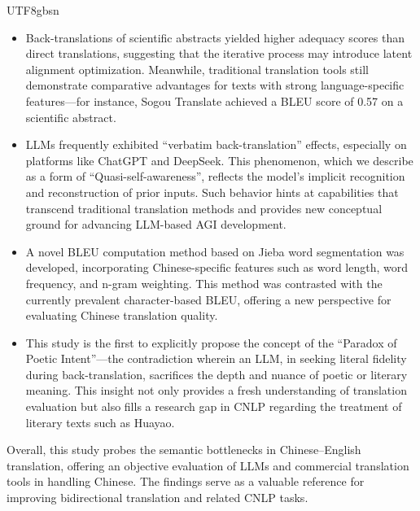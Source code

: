 \documentclass[conference]{IEEEtran}
\begin{document}
\begin{CJK*}{UTF8}{gbsn}
\begin{itemize}
\item Back-translations of scientific abstracts yielded higher adequacy scores than direct translations, suggesting that the iterative process may introduce latent alignment optimization. Meanwhile, traditional translation tools still demonstrate comparative advantages for texts with strong language-specific features—for instance, Sogou Translate achieved a BLEU score of 0.57 on a scientific abstract.

\item LLMs frequently exhibited “verbatim back-translation” effects, especially on platforms like ChatGPT and DeepSeek. This phenomenon, which we describe as a form of “Quasi-self-awareness”, reflects the model's implicit recognition and reconstruction of prior inputs. Such behavior hints at capabilities that transcend traditional translation methods and provides new conceptual ground for advancing LLM-based AGI development.

\item A novel BLEU computation method based on Jieba word segmentation was developed, incorporating Chinese-specific features such as word length, word frequency, and n-gram weighting. This method was contrasted with the currently prevalent character-based BLEU, offering a new perspective for evaluating Chinese translation quality.

\item This study is the first to explicitly propose the concept of the “Paradox of Poetic Intent”—the contradiction wherein an LLM, in seeking literal fidelity during back-translation, sacrifices the depth and nuance of poetic or literary meaning. This insight not only provides a fresh understanding of translation evaluation but also fills a research gap in CNLP regarding the treatment of literary texts such as Huayao. 
\end{itemize}

Overall, this study probes the semantic bottlenecks in Chinese–English translation, offering an objective evaluation of LLMs and commercial translation tools in handling Chinese. The findings serve as a valuable reference for improving bidirectional translation and related CNLP tasks.

    

\end{CJK*}
\end{document}
